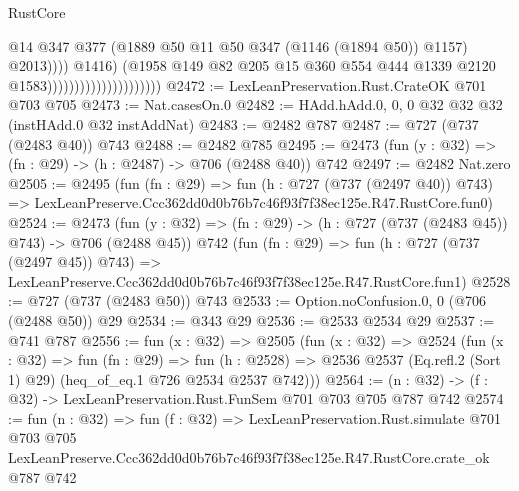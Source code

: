 \begin{lexlean}{RustCore}
\begin{coremodule}
                                                      @14
                                                      @347
                                                      @377
                                                      (@1889
                                                        @50
                                                        @11
                                                        @50
                                                        @347
                                                        (@1146 (@1894 @50))
                                                        @1157)
                                                      @2013))))
                                              @1416)
                                            (@1958
                                              @149
                                              @82
                                              @205
                                              @15
                                              @360
                                              @554
                                              @444
                                              @1339
                                              @2120
                                              @1583)))))))))))))))))))))
@2472 := LexLeanPreservation.Rust.CrateOK @701 @703 @705
@2473 := Nat.casesOn.{0}
@2482 := HAdd.hAdd.{0, 0, 0} @32 @32 @32 (instHAdd.{0} @32 instAddNat)
@2483 := @2482 @787
@2487 := @727 (@737 (@2483 @40)) @743
@2488 := @2482 @785
@2495 := @2473 (fun (y : @32) => (fn : @29) -> (h : @2487) -> @706 (@2488 @40)) @742
@2497 := @2482 Nat.zero
@2505 := @2495
    (fun (fn : @29) =>
    fun (h : @727 (@737 (@2497 @40)) @743) =>
    LexLeanPreserve.Ccc362dd0d0b76b7c46f93f7f38ec125e.R47.RustCore.fun0)
@2524 := @2473
    (fun (y : @32) => (fn : @29) -> (h : @727 (@737 (@2483 @45)) @743) -> @706 (@2488 @45))
    @742
    (fun (fn : @29) =>
    fun (h : @727 (@737 (@2497 @45)) @743) =>
    LexLeanPreserve.Ccc362dd0d0b76b7c46f93f7f38ec125e.R47.RustCore.fun1)
@2528 := @727 (@737 (@2483 @50)) @743
@2533 := Option.noConfusion.{0, 0} (@706 (@2488 @50)) @29
@2534 := @343 @29
@2536 := @2533 @2534 @29
@2537 := @741 @787
@2556 := fun (x : @32) =>
  @2505
    (fun (x : @32) =>
    @2524
      (fun (x : @32) =>
      fun (fn : @29) =>
      fun (h : @2528) =>
      @2536 @2537 (Eq.refl.{2} (Sort 1) @29) (heq_of_eq.{1} @726 @2534 @2537 @742)))
@2564 := (n : @32) -> (f : @32) -> LexLeanPreservation.Rust.FunSem @701 @703 @705 @787 @742
@2574 := fun (n : @32) =>
  fun (f : @32) =>
  LexLeanPreservation.Rust.simulate
    @701
    @703
    @705
    LexLeanPreserve.Ccc362dd0d0b76b7c46f93f7f38ec125e.R47.RustCore.crate_ok
    @787
    @742
\end{coremodule}
\end{lexlean}
